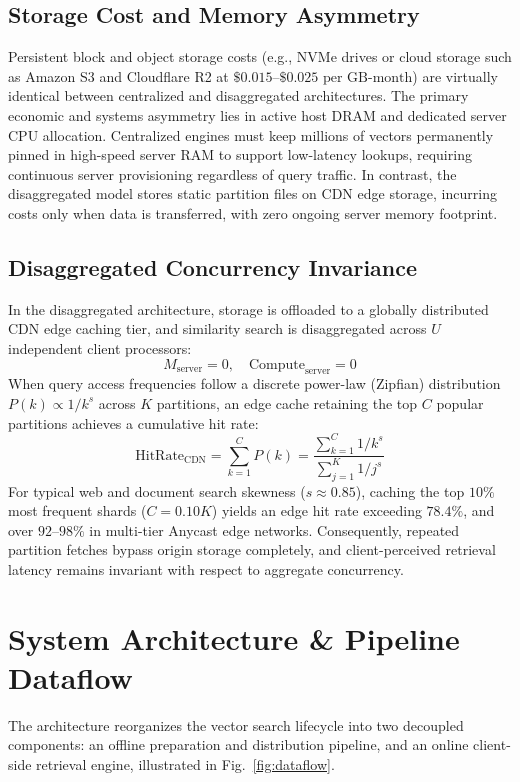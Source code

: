 \documentclass[11pt,journal,compsoc,onecolumn]{IEEEtran}
\begin{document}
\subsection{Storage Cost and Memory Asymmetry}
Persistent block and object storage costs (e.g., NVMe drives or cloud storage such as Amazon S3 and Cloudflare R2 at $\$0.015\text{--}\$0.025\text{ per GB-month}$) are virtually identical between centralized and disaggregated architectures. The primary economic and systems asymmetry lies in active host DRAM and dedicated server CPU allocation. Centralized engines must keep millions of vectors permanently pinned in high-speed server RAM to support low-latency lookups, requiring continuous server provisioning regardless of query traffic. In contrast, the disaggregated model stores static partition files on CDN edge storage, incurring costs only when data is transferred, with zero ongoing server memory footprint.

\subsection{Disaggregated Concurrency Invariance}
In the disaggregated architecture, storage is offloaded to a globally distributed CDN edge caching tier, and similarity search is disaggregated across $U$ independent client processors:
\begin{equation}
    M_{\text{server}} = 0, \quad \text{Compute}_{\text{server}} = 0
\end{equation}
When query access frequencies follow a discrete power-law (Zipfian) distribution $P(k) \propto 1/k^s$ across $K$ partitions, an edge cache retaining the top $C$ popular partitions achieves a cumulative hit rate:
\begin{equation}
    \text{HitRate}_{\text{CDN}} = \sum_{k=1}^{C} P(k) = \frac{\sum_{k=1}^C 1/k^s}{\sum_{j=1}^K 1/j^s}
\end{equation}
For typical web and document search skewness ($s \approx 0.85$), caching the top $10\%$ most frequent shards ($C = 0.10 K$) yields an edge hit rate exceeding $78.4\%$, and over $92\text{--}98\%$ in multi-tier Anycast edge networks. Consequently, repeated partition fetches bypass origin storage completely, and client-perceived retrieval latency remains invariant with respect to aggregate concurrency.

\clearpage

\section{System Architecture \& Pipeline Dataflow}
The architecture reorganizes the vector search lifecycle into two decoupled components: an offline preparation and distribution pipeline, and an online client-side retrieval engine, illustrated in Fig.~\ref{fig:dataflow}.
\end{document}
